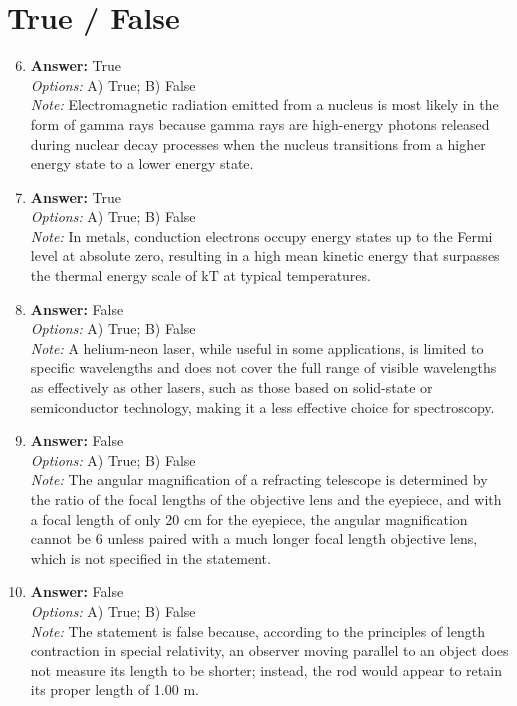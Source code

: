 \documentclass[12pt]{article}
\begin{document}
\section*{True / False}
\begin{enumerate}[label=\arabic*.]
\setcounter{enumi}{5}
\item \textbf{Answer:} True
\\ \textit{Options:} A) True; B) False
\\ \textit{Note:} Electromagnetic radiation emitted from a nucleus is most likely in the form of gamma rays because gamma rays are high-energy photons released during nuclear decay processes when the nucleus transitions from a higher energy state to a lower energy state.
\item \textbf{Answer:} True
\\ \textit{Options:} A) True; B) False
\\ \textit{Note:} In metals, conduction electrons occupy energy states up to the Fermi level at absolute zero, resulting in a high mean kinetic energy that surpasses the thermal energy scale of kT at typical temperatures.
\item \textbf{Answer:} False
\\ \textit{Options:} A) True; B) False
\\ \textit{Note:} A helium-neon laser, while useful in some applications, is limited to specific wavelengths and does not cover the full range of visible wavelengths as effectively as other lasers, such as those based on solid-state or semiconductor technology, making it a less effective choice for spectroscopy.
\item \textbf{Answer:} False
\\ \textit{Options:} A) True; B) False
\\ \textit{Note:} The angular magnification of a refracting telescope is determined by the ratio of the focal lengths of the objective lens and the eyepiece, and with a focal length of only 20 cm for the eyepiece, the angular magnification cannot be 6 unless paired with a much longer focal length objective lens, which is not specified in the statement.
\item \textbf{Answer:} False
\\ \textit{Options:} A) True; B) False
\\ \textit{Note:} The statement is false because, according to the principles of length contraction in special relativity, an observer moving parallel to an object does not measure its length to be shorter; instead, the rod would appear to retain its proper length of 1.00 m.
\end{enumerate}
\end{document}
